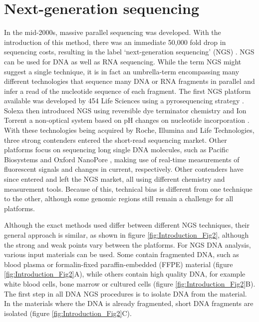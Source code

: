 \section[Next-generation sequencing]{Next-generation sequencing}\label{intro_ngs}
In the mid-2000s, massive parallel sequencing was developed. With the introduction of this method, there was an immediate 50,000 fold drop in sequencing costs, resulting in the label ‘next-generation sequencing’ (NGS) \cite{Goodwin_2016}. 
NGS can be used for DNA as well as RNA sequencing. 
While the term NGS might suggest a single technique, it is in fact an umbrella-term encompassing many different technologies that sequence many DNA or RNA fragments in parallel and infer a read of the nucleotide sequence of each fragment.
The first NGS platform available was developed by 454 Life Sciences using a pyrosequencing strategy \cite{Margulies_2005}. 
Solexa then introduced NGS using reversible dye terminator chemistry \cite{Bentley_2008} and Ion Torrent a non-optical system based on pH changes on nucleotide incorporation \cite{Rothberg_2011}. 
With these technologies being acquired by Roche, Illumina and Life Technologies, three strong contenders entered the short-read sequencing market. Other platforms focus on sequencing long single DNA molecules, such as Pacific Biosystems \cite{Eid_2009} and Oxford NanoPore \cite{Clarke_2009}, making use of real-time measurements of fluorescent signals and changes in current, respectively. 
Other contenders have since entered and left the NGS market, all using different chemistry and measurement tools. Because of this, technical bias is different from one technique to the other, although some genomic regions still remain a challenge for all platforms. 

Although the exact methods used differ between different NGS techniques, their general approach is similar, as shown in figure \ref{fig:Introduction_Fig2}, although the strong and weak points vary between the platforms. 
For NGS DNA analysis, various input materials can be used. 
Some contain fragmented DNA, such as blood plasma or formalin-fixed paraffin-embedded (FFPE) material (figure \ref{fig:Introduction_Fig2}A), while others contain high quality DNA, for example white blood cells, bone marrow or cultured cells (figure \ref{fig:Introduction_Fig2}B). 
The first step in all DNA NGS procedures is to isolate DNA from the material. 
In the materials where the DNA is already fragmented, short DNA fragments are isolated (figure \ref{fig:Introduction_Fig2}C).

